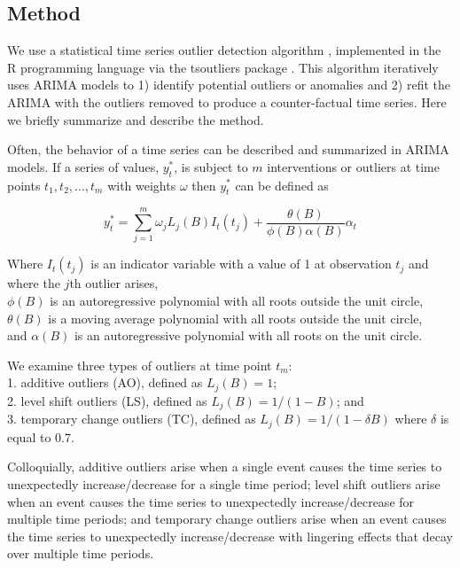 \documentclass[12pt]{article}
\begin{document}
\hypertarget{method}{%
\subsection{Method}\label{method}}

We use a statistical time series outlier detection algorithm
\citep{chen1993joint}, implemented in the R programming language
\citep{rcore} via the tsoutliers package \citep{tsoutliers2019}. This
algorithm iteratively uses ARIMA models to 1) identify potential
outliers or anomalies and 2) refit the ARIMA with the outliers removed
to produce a counter-factual time series. Here we briefly summarize and
describe the method.

Often, the behavior of a time series can be described and summarized in
ARIMA models. If a series of values, \(y_t^*\), is subject to \(m\)
interventions or outliers at time points \(t_1,t_2,…,t_m\) with weights
\(\omega\) then \(y_t^*\) can be defined as

\begin{equation}
\label{eq:arima}
y_t^* = \sum_{j=1}^{m} \omega_jL_j(B)I_t(t_j) + \frac{\theta(B)}{\phi(B)\alpha(B)}\alpha_t 
\end{equation}

Where \(I_t(t_j)\) is an indicator variable with a value of 1 at
observation \(t_j\) and where the \(j\)th outlier arises,\\
\(\phi(B)\) is an autoregressive polynomial with all roots outside the
unit circle,\\
\(\theta(B)\) is a moving average polynomial with all roots outside the
unit circle,\\
and \(\alpha(B)\) is an autoregressive polynomial with all roots on the
unit circle.

We examine three types of outliers at time point \(t_m\):\\
1. additive outliers (AO), defined as \(L_j(B)=1\);\\
2. level shift outliers (LS), defined as \(L_j(B) = 1/(1-B)\); and\\
3. temporary change outliers (TC), defined as
\(L_j(B) = 1/(1-\delta B)\) where \(\delta\) is equal to 0.7.

Colloquially, additive outliers arise when a single event causes the
time series to unexpectedly increase/decrease for a single time period;
level shift outliers arise when an event causes the time series to
unexpectedly increase/decrease for multiple time periods; and temporary
change outliers arise when an event causes the time series to
unexpectedly increase/decrease with lingering effects that decay over
multiple time periods.
\end{document}
